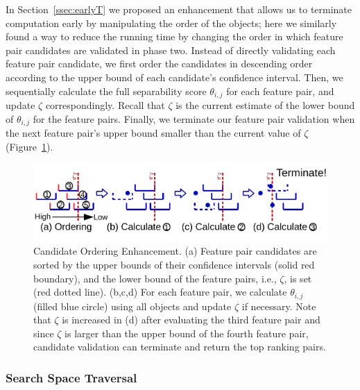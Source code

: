 In Section~\ref{ssec:earlyT} we proposed an enhancement
that allows us to terminate computation early by
manipulating the order of the objects;
here we similarly found a way to reduce the running
time by changing the order in which feature pair candidates
are validated in phase two.
Instead of directly validating each feature pair candidate,
we first order the candidates in descending order according to the upper bound of each candidate's confidence interval.
Then, we sequentially calculate the full separability
score $\theta_{i,j}$ for each feature pair, and update $\zeta$ correspondingly.
Recall that $\zeta$ is the current estimate of the lower bound of $\theta_{i,j}$ for the \topk feature pairs. Finally, we terminate our feature
pair validation when the next feature pair's upper bound smaller than the current value of $\zeta$ (Figure~\ref{fig:candidate_ordering}).

\begin{figure}[h]
 \centering
 \vspace{-5mm}
 \includegraphics[width=0.9\linewidth]{fig/candidate_ordering.pdf}
 \vspace{-5mm}
\caption{Candidate Ordering Enhancement. (a) Feature pair candidates are sorted by the upper bounds of their confidence intervals (solid red boundary), and the lower bound of the \topthree feature pairs, i.e., $\zeta$, is set (red dotted line). (b,c,d) For each feature pair, we calculate $\theta_{i,j}$ (filled blue circle) using all objects and update $\zeta$ if necessary. Note that $\zeta$ is increased in (d) after evaluating the third feature pair and since $\zeta$ is larger than the upper bound of the fourth feature pair, candidate validation can terminate and return the top ranking pairs.}
\vspace{-5mm}
\label{fig:candidate_ordering}
\end{figure}

\subsubsection{Search Space Traversal} \label{ssec:traversal}


